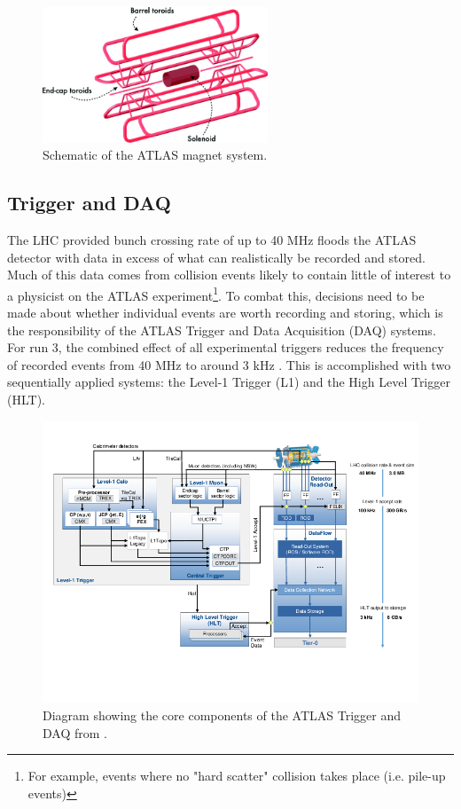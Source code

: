 \begin{figure}
\centering
    \includegraphics[width=0.6\textwidth]{images/ATLAS_Magnets.png}
    \caption{Schematic of the ATLAS magnet system.}
    \label{fig:ATLAS_Magnets}
\end{figure}

\subsection{Trigger and DAQ}

The LHC provided bunch crossing rate of up to 40 MHz floods the ATLAS detector with data in excess of what can 
realistically be recorded and stored. Much of this data comes from collision events likely to contain little of 
interest to a physicist on the ATLAS experiment\footnote{For example, events where no "hard scatter" collision 
takes place (i.e. pile-up events)}. To combat this, decisions need to be made about whether individual events are 
worth recording and storing, which is the responsibility of the ATLAS Trigger and Data Acquisition (DAQ) systems. For 
run 3, the combined effect of all experimental triggers reduces the frequency of recorded events from 40 MHz to 
around 3 kHz \cite{oliveiradamazio-trigger}. This is accomplished with two sequentially applied systems: the Level-1 
Trigger (L1) and the High Level Trigger (HLT). \par

\begin{figure}
\centering
    \includegraphics[width=1.0\textwidth]{images/Trigger_System.png}
    \caption{Diagram showing the core components of the ATLAS Trigger and DAQ from \cite{atlas-run3-setup}.}
    \label{fig:Trigger_System}
\end{figure}

